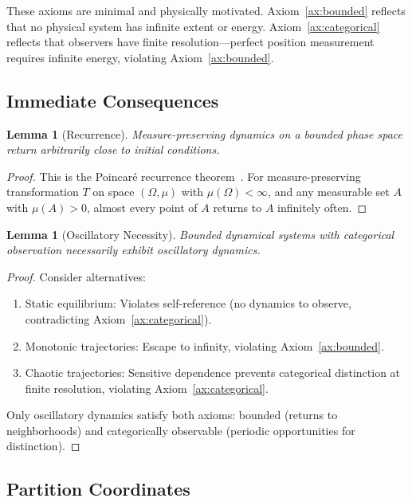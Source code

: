 \documentclass[aps,prd,twocolumn,superscriptaddress,floatfix,nofootinbib]{revtex4-2}
\newtheorem{lemma}[theorem]{Lemma}
\theoremstyle{remark}
\begin{document}
These axioms are minimal and physically motivated. Axiom~\ref{ax:bounded} reflects that no physical system has infinite extent or energy. Axiom~\ref{ax:categorical} reflects that observers have finite resolution---perfect position measurement requires infinite energy, violating Axiom~\ref{ax:bounded}.

\subsection{Immediate Consequences}

\begin{lemma}[Recurrence]
\label{lem:recurrence}
Measure-preserving dynamics on a bounded phase space return arbitrarily close to initial conditions.
\end{lemma}

\begin{proof}
This is the Poincar\'{e} recurrence theorem~\cite{poincare1890}. For measure-preserving transformation $T$ on space $(\Omega, \mu)$ with $\mu(\Omega) < \infty$, and any measurable set $A$ with $\mu(A) > 0$, almost every point of $A$ returns to $A$ infinitely often.
\end{proof}

\begin{lemma}[Oscillatory Necessity]
\label{lem:oscillatory}
Bounded dynamical systems with categorical observation necessarily exhibit oscillatory dynamics.
\end{lemma}

\begin{proof}
Consider alternatives:
\begin{enumerate}
\item Static equilibrium: Violates self-reference (no dynamics to observe, contradicting Axiom~\ref{ax:categorical}).
\item Monotonic trajectories: Escape to infinity, violating Axiom~\ref{ax:bounded}.
\item Chaotic trajectories: Sensitive dependence prevents categorical distinction at finite resolution, violating Axiom~\ref{ax:categorical}.
\end{enumerate}
Only oscillatory dynamics satisfy both axioms: bounded (returns to neighborhoods) and categorically observable (periodic opportunities for distinction).
\end{proof}

\subsection{Partition Coordinates}
\end{document}
